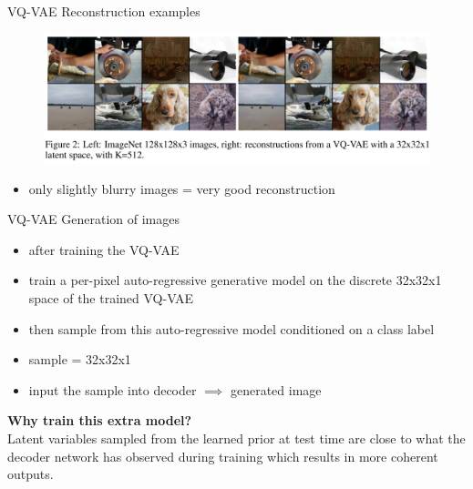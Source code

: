 \documentclass{beamer}
\begin{document}
\begin{frame}{VQ-VAE Reconstruction examples}

\begin{figure}[h]
\includegraphics[width=\textwidth]{img/reconstruction}
\end{figure}


\begin{itemize}
\item only slightly blurry images = very good reconstruction
\end{itemize}

\end{frame}
\begin{frame}{VQ-VAE Generation of images}

\begin{itemize}
\item after training the VQ-VAE
\item train a per-pixel auto-regressive generative model on the discrete 32x32x1 space of the trained VQ-VAE
\item then sample from this auto-regressive model conditioned on a class label
\item sample = 32x32x1 
\item input the sample into decoder $\implies$ generated image
\end{itemize}

\vfill
\textbf{Why train this extra model?}\\
Latent variables sampled from the learned prior at test time are close to what the decoder network has observed during training which results in more coherent outputs.


\end{frame}
\end{document}
